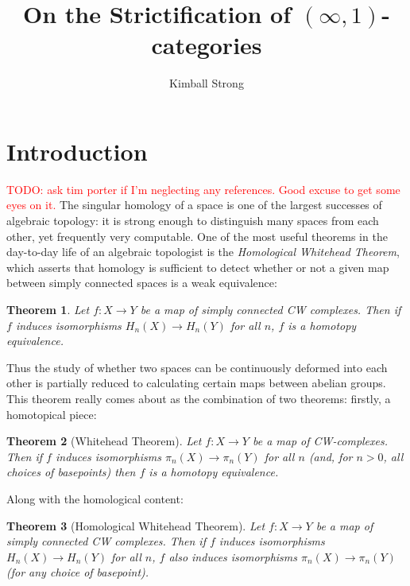 \documentclass[12pt]{article}
\newtheorem{theorem}{Theorem}[section]
\theoremstyle{definition}
\newcommand{\TODO}[1]{\textcolor{red}{TODO: {#1}}}
\begin{document}
\author{Kimball Strong}
\date{}

\title{\vspace{-1in} On the Strictification of $(\infty,1)$-categories\\ \vspace{.1in}}

\maketitle
\section{Introduction}	
	\TODO{ask tim porter if I'm neglecting any references. Good excuse to get some eyes on it.}
	The singular homology of a space is one of the largest successes of algebraic topology: it is strong enough to distinguish many spaces from each other, yet frequently very computable. 
	One of the most useful theorems in the day-to-day life of an algebraic topologist is the \textit{Homological Whitehead Theorem}, which asserts that homology is sufficient to detect whether or not a given map between simply connected spaces is a weak equivalence:
	\begin{theorem}
		Let $f:X \to Y$ be a map of simply connected CW complexes. Then if $f$ induces isomorphisms $H_n(X) \to H_n(Y)$ for all $n$, $f$ is a homotopy equivalence. 
	\end{theorem}
	Thus the study of whether two spaces can be continuously deformed into each other is partially reduced to calculating certain maps between abelian groups. This theorem really comes about as the combination of two theorems: firstly, a homotopical piece:
	\begin{theorem}[Whitehead Theorem]
		Let $f: X \to Y$ be a map of CW-complexes. Then if $f$ induces isomorphisms $\pi_n(X) \to \pi_n(Y)$ for all $n$ (and, for $n > 0$, all choices of basepoints) then $f$ is a homotopy equivalence.
	\end{theorem}
	Along with the homological content:
	\begin{theorem}[Homological Whitehead Theorem]
		Let $f: X \to Y$ be a map of simply connected CW complexes. Then if $f$ induces isomorphisms $H_n(X) \to H_n(Y)$ for all $n$, $f$ also induces isomorphisms $\pi_n(X) \to \pi_n(Y)$ (for any choice of basepoint).
	\end{theorem}
\end{document}
